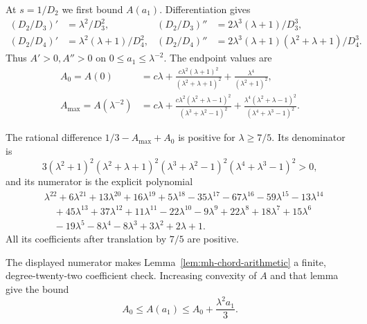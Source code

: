 At $s=1/D_2$ we first bound $A(a_1)$. Differentiation gives
\begin{align*}
 (D_2/D_3)'&=\lambda^2/D_3^2,&
 (D_2/D_3)''&=2\lambda^3(\lambda+1)/D_3^3,\\
 (D_2/D_4)'&=\lambda^2(\lambda+1)/D_4^2,&
 (D_2/D_4)''&=2\lambda^3(\lambda+1)(\lambda^2+\lambda+1)/D_4^3.
\end{align*}
Thus $A'>0,A''>0$ on $0\le a_1\le\lambda^{-2}$. The endpoint values are
\begin{align*}
 A_0=A(0)&=c\lambda+
 \frac{c\lambda^2(\lambda+1)^2}{(\lambda^2+\lambda+1)^2}
 +\frac{\lambda^4}{(\lambda^2+1)^2},\\
 A_{\max}=A(\lambda^{-2})&=c\lambda+
 \frac{c\lambda^2(\lambda^2+\lambda-1)^2}{(\lambda^3+\lambda^2-1)^2}
 +\frac{\lambda^4(\lambda^2+\lambda-1)^2}{(\lambda^4+\lambda^3-1)^2}.
\end{align*}
\begin{lemma}\label{lem:mh-chord-arithmetic}
The rational difference $1/3-A_{\max}+A_0$ is positive for $\lambda\ge7/5$. Its denominator is
\[
 3(\lambda^2+1)^2(\lambda^2+\lambda+1)^2
   (\lambda^3+\lambda^2-1)^2(\lambda^4+\lambda^3-1)^2>0,
\]
and its numerator is the explicit polynomial
\begin{align*}
 &\lambda^{22}+6\lambda^{21}+13\lambda^{20}+16\lambda^{19}+5\lambda^{18}
 -35\lambda^{17}-67\lambda^{16}-59\lambda^{15}-13\lambda^{14}\\
 &\quad+45\lambda^{13}+37\lambda^{12}+11\lambda^{11}-22\lambda^{10}-9\lambda^9
 +22\lambda^8+18\lambda^7+15\lambda^6\\
 &\quad-19\lambda^5-8\lambda^4-8\lambda^3+3\lambda^2+2\lambda+1.
\end{align*}
All its coefficients after translation by $7/5$ are positive.
\end{lemma}
The displayed numerator makes Lemma~\ref{lem:mh-chord-arithmetic} a finite, degree-twenty-two coefficient check. Increasing convexity of $A$ and that lemma give the bound
\begin{equation}\label{eq:mh-A-chord}
 A_0\le A(a_1)\le A_0+\frac{\lambda^2a_1}{3}.
\end{equation}

